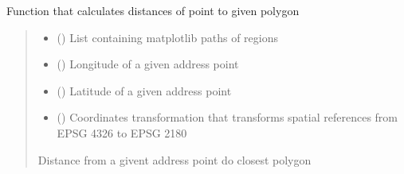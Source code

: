 \documentclass[letterpaper,10pt,english]{sphinxmanual}
\begin{document}
\begin{fulllineitems}
\label{\detokenize{geo_utilities:geo_utilities.calc_pnt_dist}}
\pysigstartsignatures
{}
\pysigstopsignatures
\sphinxAtStartPar
Function that calculates distances of point to given polygon
\begin{quote}\begin{description}
\begin{itemize}
\item {} 
\sphinxAtStartPar
{} (\sphinxcode{\sphinxupquote{List}}{[}\sphinxcode{\sphinxupquote{Path}}{]}) \textendash{} List containing matplotlib paths of regions

\item {} 
\sphinxAtStartPar
{} () \textendash{} Longitude of a given address point

\item {} 
\sphinxAtStartPar
{} () \textendash{} Latitude of a given address point

\item {} 
\sphinxAtStartPar
{} () \textendash{} Coordinates transformation that transforms spatial references from EPSG 4326 to EPSG 2180

\end{itemize}

\sphinxAtStartPar
{}

\sphinxAtStartPar
Distance from a givent address point do closest polygon

\end{description}\end{quote}

\end{fulllineitems}

\end{document}
